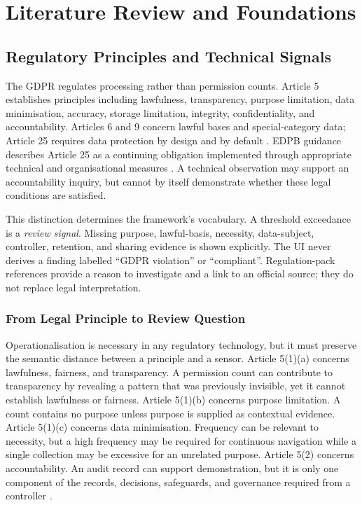 \section{Literature Review and Foundations}

\subsection{Regulatory Principles and Technical Signals}

The GDPR regulates processing rather than permission counts. Article 5 establishes principles including lawfulness, transparency, purpose limitation, data minimisation, accuracy, storage limitation, integrity, confidentiality, and accountability. Articles 6 and 9 concern lawful bases and special-category data; Article 25 requires data protection by design and by default \cite{eurlex2016}. EDPB guidance describes Article 25 as a continuing obligation implemented through appropriate technical and organisational measures \cite{edpb2019}. A technical observation may support an accountability inquiry, but cannot by itself demonstrate whether these legal conditions are satisfied.

This distinction determines the framework's vocabulary. A threshold exceedance is a \emph{review signal}. Missing purpose, lawful-basis, necessity, data-subject, controller, retention, and sharing evidence is shown explicitly. The UI never derives a finding labelled ``GDPR violation'' or ``compliant''. Regulation-pack references provide a reason to investigate and a link to an official source; they do not replace legal interpretation.

\subsubsection{From Legal Principle to Review Question}

Operationalisation is necessary in any regulatory technology, but it must preserve the semantic distance between a principle and a sensor. Article 5(1)(a) concerns lawfulness, fairness, and transparency. A permission count can contribute to transparency by revealing a pattern that was previously invisible, yet it cannot establish lawfulness or fairness. Article 5(1)(b) concerns purpose limitation. A count contains no purpose unless purpose is supplied as contextual evidence. Article 5(1)(c) concerns data minimisation. Frequency can be relevant to necessity, but a high frequency may be required for continuous navigation while a single collection may be excessive for an unrelated purpose. Article 5(2) concerns accountability. An audit record can support demonstration, but it is only one component of the records, decisions, safeguards, and governance required from a controller \cite{eurlex2016}.

